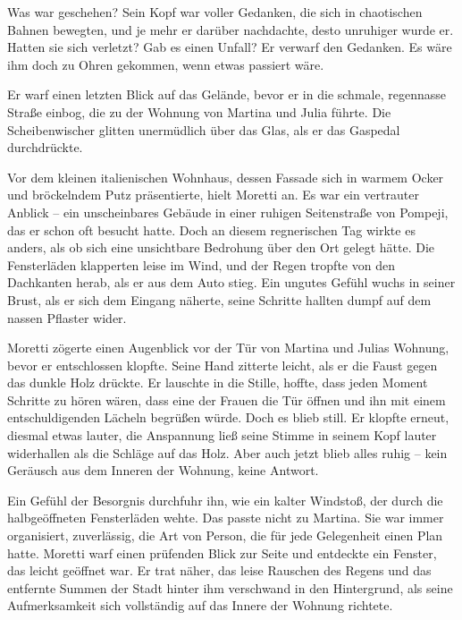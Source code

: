 \documentclass[
]{article}
\begin{document}
Was war geschehen? Sein Kopf war voller Gedanken, die sich in
chaotischen Bahnen bewegten, und je mehr er darüber nachdachte, desto
unruhiger wurde er. Hatten sie sich verletzt? Gab es einen Unfall? Er
verwarf den Gedanken. Es wäre ihm doch zu Ohren gekommen, wenn etwas
passiert wäre.

Er warf einen letzten Blick auf das Gelände, bevor er in die schmale,
regennasse Straße einbog, die zu der Wohnung von Martina und Julia
führte. Die Scheibenwischer glitten unermüdlich über das Glas, als er
das Gaspedal durchdrückte.

Vor dem kleinen italienischen Wohnhaus, dessen Fassade sich in warmem
Ocker und bröckelndem Putz präsentierte, hielt Moretti an. Es war ein
vertrauter Anblick -- ein unscheinbares Gebäude in einer ruhigen
Seitenstraße von Pompeji, das er schon oft besucht hatte. Doch an diesem
regnerischen Tag wirkte es anders, als ob sich eine unsichtbare
Bedrohung über den Ort gelegt hätte. Die Fensterläden klapperten leise
im Wind, und der Regen tropfte von den Dachkanten herab, als er aus dem
Auto stieg. Ein ungutes Gefühl wuchs in seiner Brust, als er sich dem
Eingang näherte, seine Schritte hallten dumpf auf dem nassen Pflaster
wider.

Moretti zögerte einen Augenblick vor der Tür von Martina und Julias
Wohnung, bevor er entschlossen klopfte. Seine Hand zitterte leicht, als
er die Faust gegen das dunkle Holz drückte. Er lauschte in die Stille,
hoffte, dass jeden Moment Schritte zu hören wären, dass eine der Frauen
die Tür öffnen und ihn mit einem entschuldigenden Lächeln begrüßen
würde. Doch es blieb still. Er klopfte erneut, diesmal etwas lauter, die
Anspannung ließ seine Stimme in seinem Kopf lauter widerhallen als die
Schläge auf das Holz. Aber auch jetzt blieb alles ruhig -- kein Geräusch
aus dem Inneren der Wohnung, keine Antwort.

Ein Gefühl der Besorgnis durchfuhr ihn, wie ein kalter Windstoß, der
durch die halbgeöffneten Fensterläden wehte. Das passte nicht zu
Martina. Sie war immer organisiert, zuverlässig, die Art von Person, die
für jede Gelegenheit einen Plan hatte. Moretti warf einen prüfenden
Blick zur Seite und entdeckte ein Fenster, das leicht geöffnet war. Er
trat näher, das leise Rauschen des Regens und das entfernte Summen der
Stadt hinter ihm verschwand in den Hintergrund, als seine Aufmerksamkeit
sich vollständig auf das Innere der Wohnung richtete.
\end{document}
